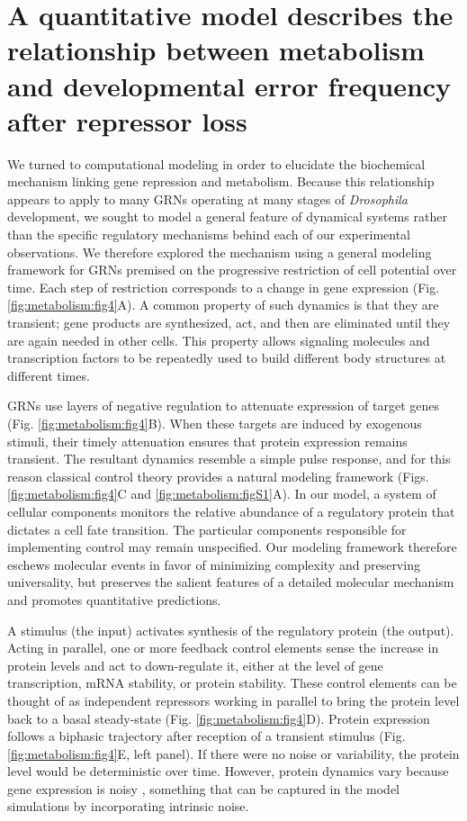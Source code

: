 \section{A quantitative model describes the relationship between metabolism and developmental error frequency after repressor loss}

We turned to computational modeling in order to elucidate the biochemical mechanism linking gene repression and metabolism. Because this relationship appears to apply to many GRNs operating at many stages of \textit{Drosophila} development, we sought to model a general feature of dynamical systems rather than the specific regulatory mechanisms behind each of our experimental observations. We therefore explored the mechanism using a general modeling framework for GRNs premised on the progressive restriction of cell potential over time. Each step of restriction corresponds to a change in gene expression (Fig. \ref{fig:metabolism:fig4}A). A common property of such dynamics is that they are transient; gene products are synthesized, act, and then are eliminated until they are again needed in other cells. This property allows signaling molecules and transcription factors to be repeatedly used to build different body structures at different times.

GRNs use layers of negative regulation to attenuate expression of target genes (Fig. \ref{fig:metabolism:fig4}B). When these targets are induced by exogenous stimuli, their timely attenuation ensures that protein expression remains transient. The resultant dynamics resemble a simple pulse response, and for this reason classical control theory provides a natural modeling framework (Figs. \ref{fig:metabolism:fig4}C and \ref{fig:metabolism:figS1}A). In our model, a system of cellular components monitors the relative abundance of a regulatory protein that dictates a cell fate transition. The particular components responsible for implementing control may remain unspecified. Our modeling framework therefore eschews molecular events in favor of minimizing complexity and preserving universality, but preserves the salient features of a detailed molecular mechanism and promotes quantitative predictions.

A stimulus (the input) activates synthesis of the regulatory protein (the output). Acting in parallel, one or more feedback control elements sense the increase in protein levels and act to down-regulate it, either at the level of gene transcription, mRNA stability, or protein stability. These control elements can be thought of as independent repressors working in parallel to bring the protein level back to a basal steady-state (Fig. \ref{fig:metabolism:fig4}D). Protein expression follows a biphasic trajectory after reception of a transient stimulus (Fig. \ref{fig:metabolism:fig4}E, left panel). If there were no noise or variability, the protein level would be deterministic over time. However, protein dynamics vary because gene expression is noisy \cite{Arias2006}, something that can be captured in the model simulations by incorporating intrinsic noise.

